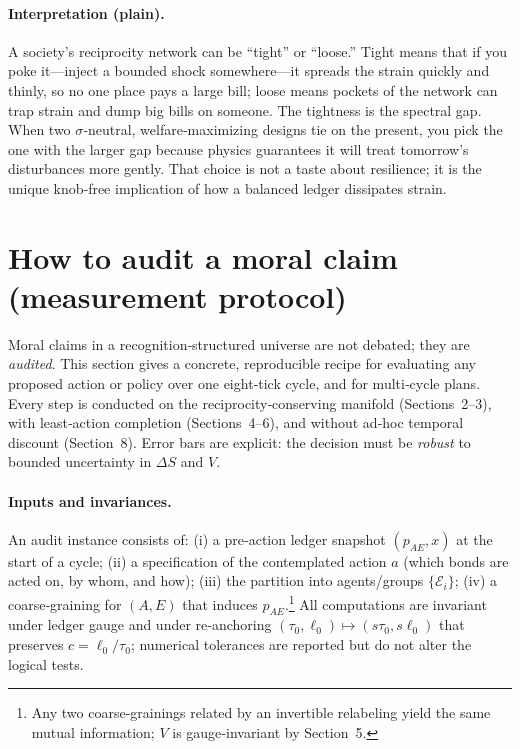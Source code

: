 \documentclass[11pt]{article}
\begin{document}
\paragraph{Interpretation (plain).}
A society’s reciprocity network can be “tight” or “loose.” Tight means that if you poke it—inject a bounded shock somewhere—it spreads the strain quickly and thinly, so no one place pays a large bill; loose means pockets of the network can trap strain and dump big bills on someone. The tightness is the spectral gap. When two $\sigma$‑neutral, welfare‑maximizing designs tie on the present, you pick the one with the larger gap because physics guarantees it will treat tomorrow’s disturbances more gently. That choice is not a taste about resilience; it is the unique knob‑free implication of how a balanced ledger dissipates strain.

\section{How to audit a moral claim (measurement protocol)}

Moral claims in a recognition‑structured universe are not debated; they are \emph{audited}. This section gives a concrete, reproducible recipe for evaluating any proposed action or policy over one eight‑tick cycle, and for multi‑cycle plans. Every step is conducted on the reciprocity‑conserving manifold (Sections~2–3), with least‑action completion (Sections~4–6), and without ad‑hoc temporal discount (Section~8). Error bars are explicit: the decision must be \emph{robust} to bounded uncertainty in $\Delta S$ and $V$.

\paragraph{Inputs and invariances.}
An audit instance consists of: (i) a pre‑action ledger snapshot $(p_{AE},x)$ at the start of a cycle; (ii) a specification of the contemplated action $a$ (which bonds are acted on, by whom, and how); (iii) the partition into agents/groups $\{\mathcal E_i\}$; (iv) a coarse‑graining for $(A,E)$ that induces $p_{AE}$.\footnote{Any two coarse‑grainings related by an invertible relabeling yield the same mutual information; $V$ is gauge‑invariant by Section~5.} All computations are invariant under ledger gauge and under re‑anchoring $(\tau_0,\ell_0)\mapsto (s\tau_0,s\ell_0)$ that preserves $c=\ell_0/\tau_0$; numerical tolerances are reported but do not alter the logical tests.
\end{document}
